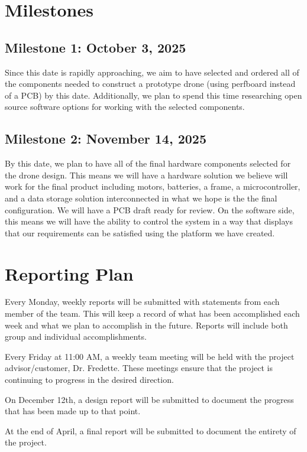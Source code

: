 \documentclass[12pt, titlepage]{article}
\begin{document}
\section{Milestones}

\subsection[October 3, 2025]{Milestone 1: October 3, 2025} Since this date is rapidly approaching, we aim to have selected and ordered all of the components needed to construct a prototype drone (using perfboard instead of a PCB) by this date. Additionally, we plan to spend this time researching open source software options for working with the selected components. \\

\subsection[November 14, 2025]{Milestone 2: November 14, 2025} By this date, we plan to have all of the final hardware components selected for the drone design. This means we will have a hardware solution we believe will work for the final product including motors, batteries, a frame, a microcontroller, and a data storage solution interconnected in what we hope is the the final configuration. We will have a PCB draft ready for review. On the software side, this means we will have the ability to control the system in a way that displays that our requirements can be satisfied using the platform we have created.

\section{Reporting Plan}
Every Monday, weekly reports will be submitted with statements from each member of the team. This will keep a record of what has been accomplished each week and what we plan to accomplish in the future. Reports will include both group and individual accomplishments.
  
Every Friday at 11:00 AM, a weekly team meeting will be held with the project advisor/customer, Dr. Fredette. These meetings ensure that the project is continuing to progress in the desired direction.
  
On December 12th, a design report will be submitted to document the progress that has been made up to that point.
  
At the end of April, a final report will be submitted to document the entirety of the project.
\end{document}
